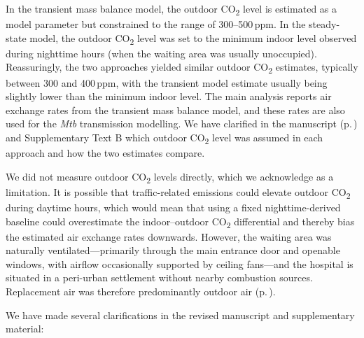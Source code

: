 \documentclass[11pt]{article}
\begin{document}
\begin{enumerate}[label=\textbf{R2.\arabic*.}, leftmargin=*]
{In the transient mass balance model, the outdoor CO\textsubscript{2} level is estimated as a model parameter but constrained to the range of 300--500\,ppm. In the steady-state model, the outdoor CO\textsubscript{2} level was set to the minimum indoor level observed during nighttime hours (when the waiting area was usually unoccupied). Reassuringly, the two approaches yielded similar outdoor CO\textsubscript{2} estimates, typically between 300 and 400\,ppm, with the transient model estimate usually being slightly lower than the minimum indoor level. The main analysis reports air exchange rates from the transient mass balance model, and these rates are also used for the \emph{Mtb} transmission modelling. We have clarified in the manuscript (p.\,\pageref{chg:R2.11envmon}) and Supplementary Text B which outdoor CO\textsubscript{2} level was assumed in each approach and how the two estimates compare.

We did not measure outdoor CO\textsubscript{2} levels directly, which we acknowledge as a limitation. It is possible that traffic-related emissions could elevate outdoor CO\textsubscript{2} during daytime hours, which would mean that using a fixed nighttime-derived baseline could overestimate the indoor--outdoor CO\textsubscript{2} differential and thereby bias the estimated air exchange rates downwards. However, the waiting area was naturally ventilated---primarily through the main entrance door and openable windows, with airflow occasionally supported by ceiling fans---and the hospital is situated in a peri-urban settlement without nearby combustion sources. Replacement air was therefore predominantly outdoor air (p.\,\pageref{chg:R2.3vent}).

We have made several clarifications in the revised manuscript and supplementary material:

}
\end{enumerate}
\end{document}
